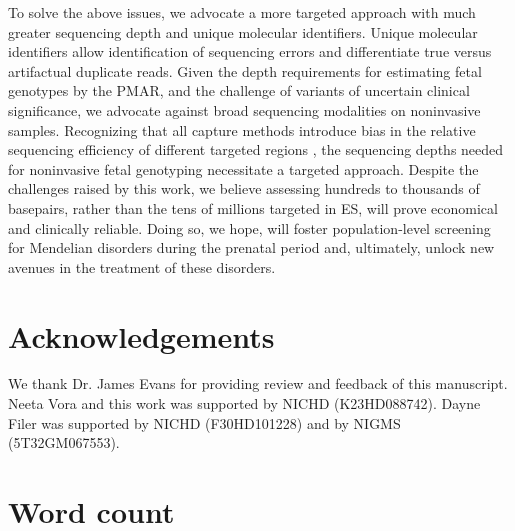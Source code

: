 \documentclass{article}\usepackage[]{graphicx}\usepackage[]{color}
\newcommand\wordcount{}
\begin{document}
To solve the above issues, we advocate a more targeted approach with much greater sequencing depth and unique molecular identifiers.
Unique molecular identifiers allow identification of sequencing errors and differentiate true versus artifactual duplicate reads.
Given the depth requirements for estimating fetal genotypes by the PMAR, and the challenge of variants of uncertain clinical significance, we advocate against broad sequencing modalities on noninvasive samples.
Recognizing that all capture methods introduce bias in the relative sequencing efficiency of different targeted regions \cite{seaby:2016aa}, the sequencing depths needed for noninvasive fetal genotyping necessitate a targeted approach.
Despite the challenges raised by this work, we believe assessing hundreds to thousands of basepairs, rather than the tens of millions targeted in ES, will prove economical and clinically reliable.
Doing so, we hope, will foster population-level screening for Mendelian disorders during the prenatal period and, ultimately, unlock new avenues in the treatment of these disorders.

\nolinenumbers

\section*{Acknowledgements}
We thank Dr. James Evans for providing review and feedback of this manuscript.
Neeta Vora and this work was supported by NICHD (K23HD088742).
Dayne Filer was supported by NICHD (F30HD101228) and by NIGMS (5T32GM067553).




\newpage
\section*{Word count}
\wordcount

\newpage
\listofchanges
\end{document}
